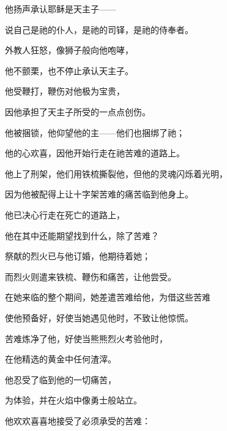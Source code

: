 他扬声承认耶稣是天主子——\par

说自己是祂的仆人，是祂的司铎，是祂的侍奉者。\par

外教人狂怒，像狮子般向他咆哮，\par

他不颤栗，也不停止承认天主子。\par

他受鞭打，鞭伤对他极为宝贵，\par

因他承担了天主子所受的一点点创伤。\par

他被捆锁，他仰望他的主——他们也捆绑了祂；\par

他的心欢喜，因他开始行走在祂苦难的道路上。\par

他上了刑架，他们用铁梳撕裂他，但他的灵魂闪烁着光明，\par

因为他被配得上让十字架苦难的痛苦临到他身上。\par

他已决心行走在死亡的道路上，\par

他在其中还能期望找到什么，除了苦难？\par

祭献的烈火已与他订婚，他期待着她；\par

而烈火则遣来铁梳、鞭伤和痛苦，让他尝受。\par

在她来临的整个期间，她差遣苦难给他，为借这些苦难\par

使他预备好，好使当她遇见他时，不致让他惊慌。\par

苦难炼净了他，好使当熊熊烈火考验他时，\par

在他精选的黄金中任何渣滓。\par

他忍受了临到他的一切痛苦，\par

为体验，并在火焰中像勇士般站立。\par

他欢欢喜喜地接受了必须承受的苦难：\par

